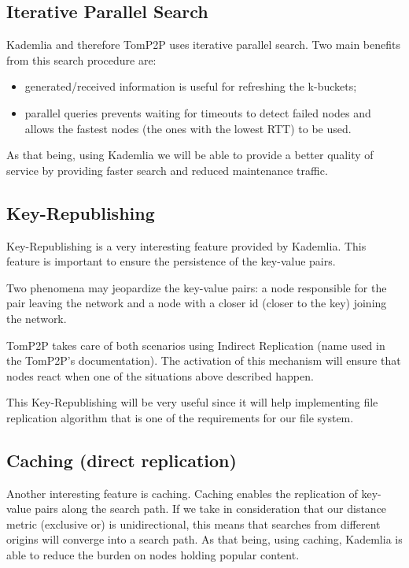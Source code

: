 \documentclass[times,9pt,article]{llncs}
\begin{document}
\subsection{Iterative Parallel Search}
Kademlia and therefore TomP2P uses iterative parallel search. Two main benefits
from this search procedure are: 

\begin{itemize}
\item generated/received information is useful for refreshing the k-buckets;
\item parallel queries prevents waiting for timeouts to detect failed nodes and 
allows the fastest nodes (the ones with the lowest RTT) to be used. 
\end{itemize} 

As that being, using Kademlia we will be able to provide a better quality of
service by providing faster search and reduced maintenance traffic.

\subsection{Key-Republishing}
Key-Republishing is a very interesting feature provided by Kademlia. This feature
is important to ensure the persistence of the key-value pairs.

Two phenomena may jeopardize the key-value pairs: a node responsible for the pair
leaving the network and a node with a closer id (closer to the key) joining the
network. 

TomP2P takes care of both scenarios using Indirect Replication (name used in the
TomP2P's documentation). The activation of this mechanism will ensure that nodes
react when one of the situations above described happen. 

This Key-Republishing will be very useful since it will help implementing file
replication algorithm that is one of the requirements for our file system.   

\subsection{Caching (direct replication)}

Another interesting feature is caching. Caching enables the replication of 
key-value pairs along the search path. If we take in consideration that our 
distance metric (exclusive or) is unidirectional, this means that searches 
from different origins will converge into a search path. As that being, using
caching, Kademlia is able to reduce the burden on nodes holding popular content.
\end{document}
